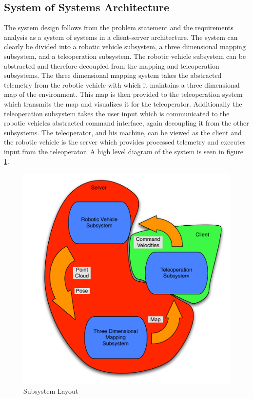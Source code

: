 \documentclass[12pt]{report}
\begin{document}
\subsection{System of Systems Architecture}
The system design follows from the problem statement and the requirements analysis as a system of systems in a client-server architecture.  The system can clearly be divided into a robotic vehicle subsystem, a three dimensional mapping subsystem, and a teleoperation subsystem.  The robotic vehicle subsystem can be abstracted and therefore decoupled from the mapping and teleoperation subsystems.  The three dimensional mapping system takes the abstracted telemetry from the robotic vehicle with which it maintains a three dimensional map of the environment.  This map is then provided to the teleoperation system which transmits the map and visualizes it for the teleoperator.  Additionally the teleoperation subsystem takes the user input which is communicated to the robotic vehicles abstracted command interface, again decoupling it from the other subsystems.  The teleoperator, and his machine, can be viewed as the client and the robotic vehicle is the server which provides processed telemetry and executes input from the teleoperator.  A high level diagram of the system is seen in figure \ref{fig:subsystem}.

\begin{figure}[ht]
  \centering
  \includegraphics[width=5in,keepaspectratio]{subsystem.pdf}
  \caption{Subsystem Layout}
  \label{fig:subsystem}
\end{figure}
\end{document}
